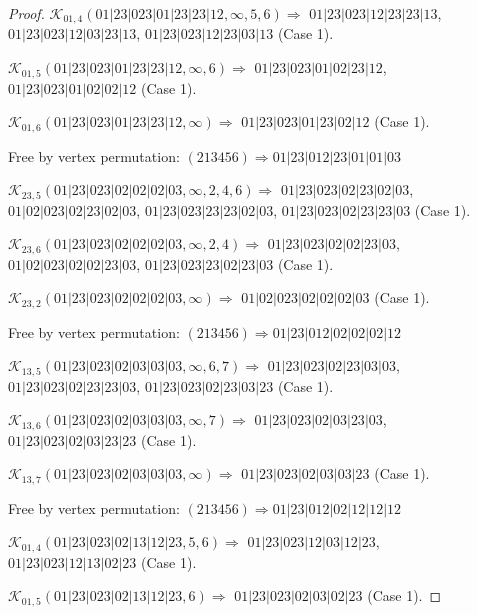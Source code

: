 \documentclass[12pt]{article}
\theoremstyle{plain}
\theoremstyle{definition}
\theoremstyle{remark}
\newcommand{\fancy}[1]{\mathcal{#1}}
\def\K{\fancy{K}}
\begin{document}
\begin{proof}
	
	
	\bigskip
	
	$\K_{01,4}(01|23|023|01|23|23|12,\infty,5, 6)\Rightarrow $ $01|23|023|12|23|23|13$, $01|23|023|12|03|23|13$, $01|23|023|12|23|03|13$ (Case 1).
	
	$\K_{01,5}(01|23|023|01|23|23|12,\infty,6)\Rightarrow $ $01|23|023|01|02|23|12$, $01|23|023|01|02|02|12$ (Case 1).
	
	$\K_{01,6}(01|23|023|01|23|23|12,\infty)\Rightarrow $ $01|23|023|01|23|02|12$ (Case 1).
	
	
	
	Free by vertex permutation: $(2 1 3 4 5 6)\Rightarrow 01|23|012|23|01|01|03$
	
	
	
	\bigskip
	
	$\K_{23,5}(01|23|023|02|02|02|03,\infty,2, 4, 6)\Rightarrow $ $01|23|023|02|23|02|03$, $01|02|023|02|23|02|03$, $01|23|023|23|23|02|03$, $01|23|023|02|23|23|03$ (Case 1).
	
	$\K_{23,6}(01|23|023|02|02|02|03,\infty,2, 4)\Rightarrow $ $01|23|023|02|02|23|03$, $01|02|023|02|02|23|03$, $01|23|023|23|02|23|03$ (Case 1).
	
	$\K_{23,2}(01|23|023|02|02|02|03,\infty)\Rightarrow $ $01|02|023|02|02|02|03$ (Case 1).
	
	
	
	Free by vertex permutation: $(2 1 3 4 5 6)\Rightarrow 01|23|012|02|02|02|12$
	
	
	
	\bigskip
	
	$\K_{13,5}(01|23|023|02|03|03|03,\infty,6, 7)\Rightarrow $ $01|23|023|02|23|03|03$, $01|23|023|02|23|23|03$, $01|23|023|02|23|03|23$ (Case 1).
	
	$\K_{13,6}(01|23|023|02|03|03|03,\infty,7)\Rightarrow $ $01|23|023|02|03|23|03$, $01|23|023|02|03|23|23$ (Case 1).
	
	$\K_{13,7}(01|23|023|02|03|03|03,\infty)\Rightarrow $ $01|23|023|02|03|03|23$ (Case 1).
	
	
	
	Free by vertex permutation: $(2 1 3 4 5 6)\Rightarrow 01|23|012|02|12|12|12$
	
	
	
	\bigskip
	
	$\K_{01,4}(01|23|023|02|13|12|23,5, 6)\Rightarrow $ $01|23|023|12|03|12|23$, $01|23|023|12|13|02|23$ (Case 1).
	
	$\K_{01,5}(01|23|023|02|13|12|23,6)\Rightarrow $ $01|23|023|02|03|02|23$ (Case 1).
	

\end{proof}
\end{document}
